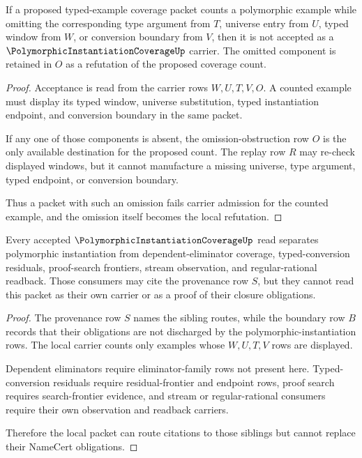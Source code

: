 \begin{theorem}
\label{thm:polymorphic-instantiation-omission-refutation}
If a proposed typed-example coverage packet counts a polymorphic example while omitting the corresponding type argument from $T$, universe entry from $U$, typed window from $W$, or conversion boundary from $V$, then it is not accepted as a $\PolymorphicInstantiationCoverageUp$ carrier. The omitted component is retained in $O$ as a refutation of the proposed coverage count.
\end{theorem}
\begin{proof}
Acceptance is read from the carrier rows $W,U,T,V,O$. A counted example must display its typed window, universe substitution, typed instantiation endpoint, and conversion boundary in the same packet.

If any one of those components is absent, the omission-obstruction row $O$ is the only available destination for the proposed count. The replay row $R$ may re-check displayed windows, but it cannot manufacture a missing universe, type argument, typed endpoint, or conversion boundary.

Thus a packet with such an omission fails carrier admission for the counted example, and the omission itself becomes the local refutation.
\end{proof}

\begin{theorem}
\label{thm:polymorphic-instantiation-sibling-separation}
Every accepted $\PolymorphicInstantiationCoverageUp$ read separates polymorphic instantiation from dependent-eliminator coverage, typed-conversion residuals, proof-search frontiers, stream observation, and regular-rational readback. Those consumers may cite the provenance row $S$, but they cannot read this packet as their own carrier or as a proof of their closure obligations.
\end{theorem}
\begin{proof}
The provenance row $S$ names the sibling routes, while the boundary row $B$ records that their obligations are not discharged by the polymorphic-instantiation rows. The local carrier counts only examples whose $W,U,T,V$ rows are displayed.

Dependent eliminators require eliminator-family rows not present here. Typed-conversion residuals require residual-frontier and endpoint rows, proof search requires search-frontier evidence, and stream or regular-rational consumers require their own observation and readback carriers.

Therefore the local packet can route citations to those siblings but cannot replace their NameCert obligations.
\end{proof}

